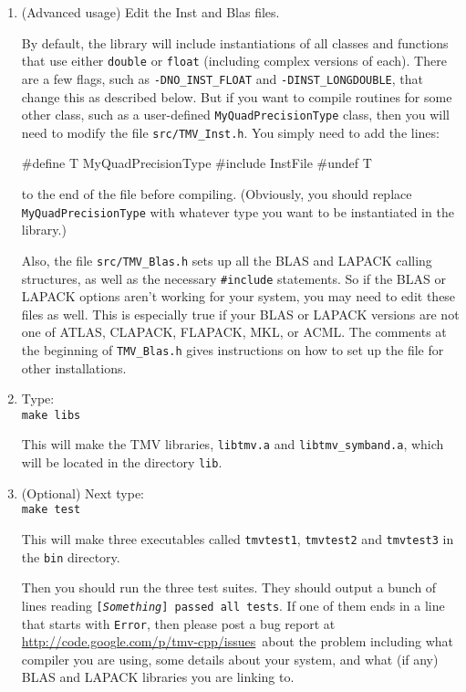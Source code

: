 \documentclass[twoside,letterpaper,11pt]{article}
\newcommand{\myissuesx}{http://code.google.com/p/tmv-cpp/issues}
\newcommand{\myissues}{\url{\myissuesx}}
\renewcommand{\tt}[1]{{\lstinline {#1}}}
\begin{document}
\begin{enumerate}
See the next section below for a complete list of compiler flags that control how the TMV library is built.

\item
(Advanced usage) Edit the Inst and Blas files.

By default, the library will include instantiations of all classes and 
functions
that use either \texttt{double} or \texttt{float} (including complex versions of each).  
There are a few flags, such as 
\texttt{-DNO\_INST\_FLOAT} and \texttt{-DINST\_LONGDOUBLE},
that change this as described below.  
But if you want to compile routines for some other class, such as a user-defined
\texttt{MyQuadPrecisionType} class, then you will need to modify the file 
\texttt{src/TMV\_Inst.h}.
You simply need to add the lines:
\begin{tmvcode}
#define T MyQuadPrecisionType
#include InstFile
#undef T
\end{tmvcode}
to the end of the file before compiling.  (Obviously, you should
replace \tt{MyQuadPrecisionType} with whatever
type you want to be instantiated in the library.)

Also, the file \texttt{src/TMV\_Blas.h}
sets up all the BLAS and LAPACK calling structures,
as well as the necessary \texttt{\#include} statements.  
So if the BLAS or LAPACK options aren't working 
for your system, you may need to edit these files as well.
This is especially true if your BLAS or LAPACK versions are not one of 
ATLAS, CLAPACK, FLAPACK, MKL, or ACML.  The comments at the beginning of 
\texttt{TMV\_Blas.h} gives instructions on how to set up the file for 
other installations.

\item
Type: \\
\texttt{make libs}

This will make the TMV libraries, \texttt{libtmv.a} and \texttt{libtmv\_symband.a},
which will be located in the directory \texttt{lib}.

\item
(Optional) Next type:\\
\texttt{make test}

This will make three executables called \texttt{tmvtest1}, 
\texttt{tmvtest2} and \texttt{tmvtest3} in the \texttt{bin} directory.

Then you should run the three test suites.
They should output a bunch of lines reading \texttt{[{\em Something}] passed all tests}.
If one of them ends in a line that starts with \texttt{Error}, 
then please post a bug report at \myissues\ about the problem including what compiler
you are using, some details about your system, and what (if any) BLAS and LAPACK
libraries you are linking to.


\end{enumerate}
\end{document}
